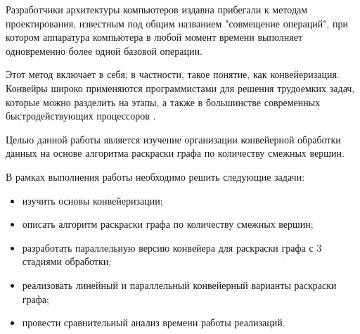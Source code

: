 \vspace{\baselineskip}

Разработчики архитектуры компьютеров издавна прибегали к методам проектирования, известным под общим названием "совмещение операций", при котором аппаратура компьютера в любой момент времени выполняет одновременно более одной базовой операции.

Этот метод включает в себя, в частности, такое понятие, как
конвейеризация. Конвейры широко применяются программистами для решения трудоемких задач, которые можно разделить на этапы, а также в
большинстве современных быстродействующих процессоров \cite{conveyor}.

Целью данной работы является изучение организации конвейерной обработки данных на основе алгоритма раскраски графа по количеству смежных вершин.

В рамках выполнения работы необходимо решить следующие задачи: 
\begin{itemize}[label=---]
	\item изучить основы конвейеризации;
	\item описать алгоритм раскраски графа по количеству смежных вершин;
	\item разработать параллельную версию конвейера для раскраски графа с 3 стадиями обработки;
	\item реализовать линейный и параллельный конвейерный варианты раскраски графа;
	\item провести сравнительный анализ времени работы реализаций.
\end{itemize}